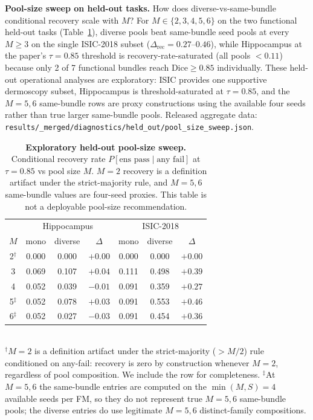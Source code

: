 \textbf{Pool-size sweep on held-out tasks.} How does diverse-vs-same-bundle conditional recovery scale with $M$? For $M{\in}\{2,3,4,5,6\}$ on the two functional held-out tasks (Table~\ref{tab:pool-size-sweep}), diverse pools beat same-bundle seed pools at every $M{\geq}3$ on the single ISIC-2018 subset ($\Delta_{\mathrm{rec}}{=}0.27$--$0.46$), while Hippocampus at the paper's $\tau{=}0.85$ threshold is recovery-rate-saturated (all pools ${<}0.11$) because only 2 of 7 functional bundles reach Dice${\geq}0.85$ individually. These held-out operational analyses are exploratory: ISIC provides one supportive dermoscopy subset, Hippocampus is threshold-saturated at $\tau{=}0.85$, and the $M{=}5,6$ same-bundle rows are proxy constructions using the available four seeds rather than true larger same-bundle pools. Released aggregate data: \texttt{results/\_merged/diagnostics/held\_out/pool\_size\_sweep.json}.

\begin{table}[!htbp]
  \caption{\textbf{Exploratory held-out pool-size sweep.} Conditional recovery rate $P[\text{ens pass}\mid\text{any fail}]$ at $\tau{=}0.85$ vs pool size $M$. $M{=}2$ recovery is a definition artifact under the strict-majority rule, and $M{=}5,6$ same-bundle values are four-seed proxies. This table is not a deployable pool-size recommendation.}
  \label{tab:pool-size-sweep}
  \centering\small
  \begin{tabular}{c|ccc|ccc}
    \toprule
    & \multicolumn{3}{c|}{Hippocampus} & \multicolumn{3}{c}{ISIC-2018} \\
    $M$ & mono & diverse & $\Delta$ & mono & diverse & $\Delta$ \\
    \midrule
    2$^{\dag}$ & 0.000 & 0.000 & $+0.00$ & 0.000 & 0.000 & $+0.00$ \\
    3 & 0.069 & 0.107 & $+0.04$ & 0.111 & 0.498 & $+0.39$ \\
    4 & 0.052 & 0.039 & $-0.01$ & 0.091 & 0.359 & $+0.27$ \\
    5$^{\ddagger}$ & 0.052 & 0.078 & $+0.03$ & 0.091 & 0.553 & $+0.46$ \\
    6$^{\ddagger}$ & 0.052 & 0.027 & $-0.03$ & 0.091 & 0.454 & $+0.36$ \\
    \bottomrule
  \end{tabular}
  \\[2pt]
  {\footnotesize $^{\dag}$$M{=}2$ is a definition artifact under the strict-majority (${>}M/2$) rule conditioned on any-fail: recovery is zero by construction whenever $M{=}2$, regardless of pool composition. We include the row for completeness. $^{\ddagger}$At $M{=}5,6$ the same-bundle entries are computed on the $\min(M,S){=}4$ available seeds per FM, so they do not represent true $M{=}5,6$ same-bundle pools; the diverse entries do use legitimate $M{=}5,6$ distinct-family compositions.}
\end{table}


